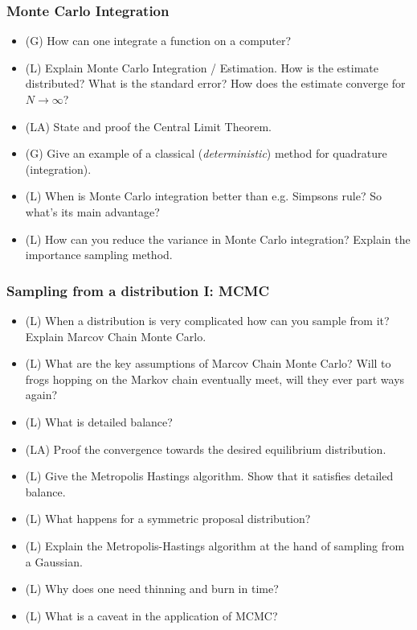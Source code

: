 \subsubsection*{Monte Carlo Integration}
\begin{itemize}
    \item (G) How can one integrate a function on a computer?
    \item (L) Explain Monte Carlo Integration / Estimation. How is the estimate distributed? What is the standard error? How does the estimate converge for $N \rightarrow \infty$?
    \item (LA) State and proof the Central Limit Theorem.
    \item (G) Give an example of a classical (\textit{deterministic}) method for quadrature (integration).
    \item (L) When is Monte Carlo integration better than e.g. Simpsons rule? So what's its main advantage?
    \item (L) How can you reduce the variance in Monte Carlo integration? Explain the importance sampling method.
\end{itemize}

\subsubsection*{Sampling from a distribution I: MCMC}

\begin{itemize}
    \item (L) When a distribution is very complicated how can you sample from it? Explain Marcov Chain Monte Carlo.
    \item (L) What are the key assumptions of Marcov Chain Monte Carlo? Will to frogs hopping on the Markov chain eventually meet, will they ever part ways again?
    \item (L) What is detailed balance?
    \item (LA) Proof the convergence towards the desired equilibrium distribution.
    \item (L) Give the Metropolis Hastings algorithm. Show that it satisfies detailed balance.
    \item (L) What happens for a symmetric proposal distribution?
    \item (L) Explain the Metropolis-Hastings algorithm at the hand of sampling from a Gaussian.
    \item (L) Why does one need thinning and burn in time?
    \item (L) What is a caveat in the application of MCMC?
\end{itemize}

